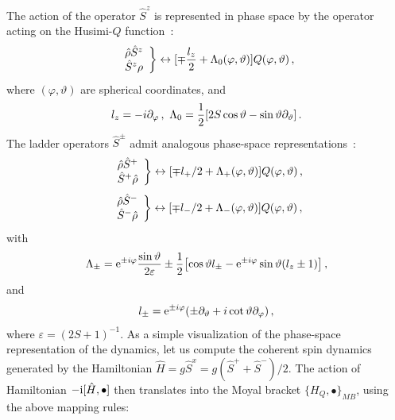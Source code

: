\documentclass[aps,prl,twocolumn,superscriptaddress,english,floatfix]{revtex4-2}
\let\originalleft\left
\let\originalright\right
\renewcommand{\left}{\mathopen{}\mathclose\bgroup\originalleft}
\renewcommand{\right}{\aftergroup\egroup\originalright}
\def\rmi{{\rm {i}}}
\newcommand{\Hhat}{\hat{H}}
\begin{document}
The action of the operator $\hat S^z$ is represented in phase space by the operator acting on the Husimi-$Q$ function~\cite{KlimovChumakov2009}:
\begin{equation}
    \left.\begin{array}{l} \hat \rho \hat S^z \\ \hat S^z \rho \end{array}\right\} \leftrightarrow [\mp \frac{l_z}{2} + \Lambda_0(\varphi, \vartheta) ]Q(\varphi, \vartheta)\,,
\end{equation}
where $(\varphi, \vartheta)$ are spherical coordinates, and
\begin{equation}
    l_z = -i \partial_\varphi\,,~
    \Lambda_0 = \frac{1}{2}\left[ 2S \cos \vartheta - \sin \vartheta \partial_\vartheta \right]\,.
\end{equation} 
The ladder operators $\hat S^\pm$ admit analogous phase-space representations~\cite{KlimovChumakov2009}:
\begin{equation}
    \left.\begin{array}{l} \hat \rho \hat S^+ \\ \hat S^+ \hat \rho \end{array}\right\} \leftrightarrow [\mp l_{+} / 2+\Lambda_{+}(\varphi, \vartheta)]Q(\varphi,\vartheta)\,, 
\end{equation}
\begin{equation}
    \left.\begin{array}{l} \hat \rho \hat S^- \\ \hat S^- \hat \rho \end{array}\right\} \leftrightarrow [\mp l_{-} / 2+\Lambda_{-}(\varphi, \vartheta)]Q(\varphi,\vartheta)\,,
\end{equation}
with
\begin{equation}
    \Lambda_{ \pm}=\mathrm{e}^{ \pm i \varphi} \frac{\sin \vartheta}{2 \varepsilon} \pm \frac{1}{2}\left[\cos \vartheta l_{ \pm}-\mathrm{e}^{ \pm i \varphi} \sin \vartheta\left(l_z \pm 1\right)\right]\,,
\end{equation}
and 
\begin{equation}
    l_{ \pm}=\mathrm{e}^{ \pm i \varphi}\left( \pm \partial_\vartheta+i \cot \vartheta \partial_\varphi\right)\,,
\end{equation}
where $\varepsilon=(2S+1)^{-1}$.
As a simple visualization of the phase-space representation of the dynamics, let us compute the coherent spin dynamics generated by the Hamiltonian $\hat H =g \hat S^x = {g}(\hat S^+ +\hat S^-)/2$.
The action of Hamiltonian $-\rmi[\Hhat,\bullet]$ then translates into the Moyal bracket $\{ H_Q,\bullet \}_{MB}$, using the above mapping rules:
\end{document}
